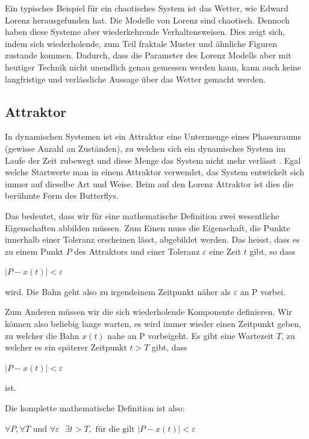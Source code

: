 Ein typisches Beispiel für ein chaotisches System ist das Wetter, wie Edward Lorenz herausgefunden hat. Die Modelle von Lorenz sind chaotisch. Dennoch haben diese Systeme aber	 wiederkehrende Verhaltensweisen. Dies zeigt sich, indem sich wiederholende, zum Teil fraktale Muster und ähnliche Figuren zustande kommen. Dadurch, dass die Parameter des Lorenz Modells aber mit heutiger Technik nicht unendlich genau gemessen werden kann, kann auch keine langfristige und verlässliche Aussage über das Wetter gemacht werden. 

\subsection{Attraktor}
In dynamischen Systemen ist ein Attraktor eine Untermenge eines Phasenraums (gewisse Anzahl an Zuständen), zu welchen sich ein dynamisches System im Laufe der Zeit zubewegt und diese Menge das System nicht mehr verlässt \cite{wikiattraktor}. 
Egal welche Startwerte man in einem Attraktor verwendet, das System entwickelt sich immer auf dieselbe Art und Weise. Beim auf den Lorenz Attraktor ist dies die berühmte Form des Butterflys. 

Das bedeutet, dass wir für eine mathematische Definition zwei wesentliche Eigenschaften abbilden müssen. Zum Einen muss die Eigenschaft, die Punkte innerhalb einer Toleranz erscheinen lässt, abgebildet werden. Das heisst, dass es zu einem Punkt $P$ des Attraktors  und einer Toleranz $\varepsilon$ eine Zeit $t$ gibt, so dass 

\begin{center}
	$|P - x(t)| < \varepsilon$
\end{center}
wird. Die Bahn geht also zu irgendeinem Zeitpunkt näher als $\varepsilon$ an P vorbei.

Zum Anderen müssen wir die sich wiederholende Komponente definieren. Wir können also beliebig lange warten, es wird immer wieder einen Zeitpunkt geben, zu welcher die Bahn $x(t)$ nahe an P vorbeigeht. Es gibt eine Wartezeit $T$, zu welcher es ein späterer Zeitpunkt $t > T$ gibt, dass
\begin{center}
	$|P - x(t) |< \varepsilon$
\end{center}
ist.

Die komplette mathematische Definition ist also:

\begin{center}\label{Attraktor}
$\forall P, \forall T \text{ und } \forall \varepsilon \text{ } \exists t > T , \text{ für die gilt } |P - x(t) |< \varepsilon$
\end{center}

